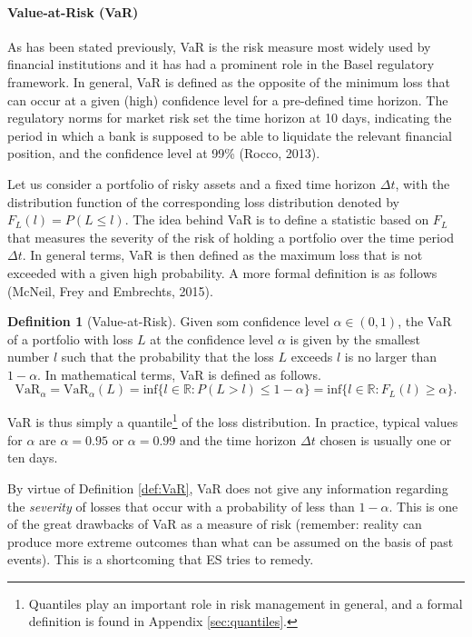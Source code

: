 \documentclass[a4paper,11pt]{article}
\theoremstyle{definition}
\newtheorem{definition}{Definition}[section]
\theoremstyle{definition}
\theoremstyle{definition}
\theoremstyle{definition}
\theoremstyle{remark}
\begin{document}
\hypertarget{value-at-risk-var}{%
\paragraph{Value-at-Risk (VaR)}\label{value-at-risk-var}}

As has been stated previously, VaR is the risk measure most widely used by financial institutions and it has had a prominent role in the Basel regulatory framework. In general, VaR is defined as the opposite of the minimum loss that can occur at a given (high) confidence level for a pre-defined time horizon. The regulatory norms for market risk set the time horizon at 10 days, indicating the period in which a bank is supposed to be able to liquidate the relevant financial position, and the confidence level at 99\% (Rocco, 2013).

Let us consider a portfolio of risky assets and a fixed time horizon \(\Delta t\), with the distribution function of the corresponding loss distribution denoted by \(F_{L}(l)=P(L \leq l)\). The idea behind VaR is to define a statistic based on \(F_L\) that measures the severity of the risk of holding a portfolio over the time period \(\Delta t\). In general terms, VaR is then defined as the maximum loss that is not exceeded with a given high probability. A more formal definition is as follows (McNeil, Frey and Embrechts, 2015).
\begin{definition}[Value-at-Risk]
\protect\hypertarget{def:VaR}{}{\label{def:VaR} {} }
Given som confidence level \(\alpha \in (0,1)\), the VaR of a portfolio with loss \(L\) at the confidence level \(\alpha\) is given by the smallest number \(l\) such that the probability that the loss \(L\) exceeds \(l\) is no larger than \(1-\alpha\). In mathematical terms, VaR is defined as follows.
\begin{equation}
\text{VaR}_{\alpha} = \text{VaR}_{\alpha}(L) = \text{inf}\{l \in \mathbb R: P(L > l) \leq 1 - \alpha \} = \text{inf}\{l \in \mathbb R: F_{L}(l) \geq \alpha \}.
\label{eq:VaR}
\end{equation}
\end{definition}
VaR is thus simply a quantile\footnote{Quantiles play an important role in risk management in general, and a formal definition is found in Appendix \ref{sec:quantiles}.} of the loss distribution. In practice, typical values for \(\alpha\) are \(\alpha = 0.95\) or \(\alpha = 0.99\) and the time horizon \(\Delta t\) chosen is usually one or ten days.

By virtue of Definition \ref{def:VaR}, VaR does not give any information regarding the \emph{severity} of losses that occur with a probability of less than \(1 - \alpha\). This is one of the great drawbacks of VaR as a measure of risk (remember: reality can produce more extreme outcomes than what can be assumed on the basis of past events). This is a shortcoming that ES tries to remedy.
\end{document}
